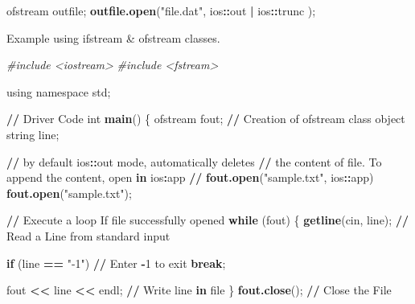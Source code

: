 \documentclass[
]{article}
\newenvironment{Shaded}{\begin{snugshade}}{\end{snugshade}}
\newcommand{\CommentTok}[1]{\textcolor[rgb]{0.56,0.35,0.01}{\textit{#1}}}
\newcommand{\ControlFlowTok}[1]{\textcolor[rgb]{0.13,0.29,0.53}{\textbf{#1}}}
\newcommand{\DecValTok}[1]{\textcolor[rgb]{0.00,0.00,0.81}{#1}}
\newcommand{\ErrorTok}[1]{\textcolor[rgb]{0.64,0.00,0.00}{\textbf{#1}}}
\newcommand{\FunctionTok}[1]{\textcolor[rgb]{0.13,0.29,0.53}{\textbf{#1}}}
\newcommand{\NormalTok}[1]{#1}
\newcommand{\SpecialCharTok}[1]{\textcolor[rgb]{0.81,0.36,0.00}{\textbf{#1}}}
\newcommand{\StringTok}[1]{\textcolor[rgb]{0.31,0.60,0.02}{#1}}
\begin{document}
\begin{Shaded}
\begin{Highlighting}[]
\NormalTok{ofstream outfile;}
\FunctionTok{outfile.open}\NormalTok{(}\StringTok{"file.dat"}\NormalTok{, ios}\SpecialCharTok{::}\NormalTok{out }\SpecialCharTok{|}\NormalTok{ ios}\SpecialCharTok{::}\NormalTok{trunc );}
\end{Highlighting}
\end{Shaded}

Example using ifstream \& ofstream classes.

\begin{Shaded}
\begin{Highlighting}[]
\CommentTok{\#include \textless{}iostream\textgreater{} }
\CommentTok{\#include \textless{}fstream\textgreater{} }
  
\NormalTok{using namespace std; }
  
\SpecialCharTok{/}\ErrorTok{/}\NormalTok{ Driver Code }
\NormalTok{int }\FunctionTok{main}\NormalTok{() }
\NormalTok{\{ }
\NormalTok{    ofstream fout; }\SpecialCharTok{/}\ErrorTok{/}\NormalTok{ Creation of ofstream class object }
\NormalTok{    string line; }
  
    \SpecialCharTok{/}\ErrorTok{/}\NormalTok{ by default ios}\SpecialCharTok{::}\NormalTok{out mode, automatically deletes }
    \SpecialCharTok{/}\ErrorTok{/}\NormalTok{ the content of file. To append the content, open }\ControlFlowTok{in}\NormalTok{ ios}\SpecialCharTok{:}\NormalTok{app }
    \SpecialCharTok{/}\ErrorTok{/} \FunctionTok{fout.open}\NormalTok{(}\StringTok{"sample.txt"}\NormalTok{, ios}\SpecialCharTok{::}\NormalTok{app) }
    \FunctionTok{fout.open}\NormalTok{(}\StringTok{"sample.txt"}\NormalTok{); }
  
    \SpecialCharTok{/}\ErrorTok{/}\NormalTok{ Execute a loop If file successfully opened }
    \ControlFlowTok{while}\NormalTok{ (fout) \{ }
        \FunctionTok{getline}\NormalTok{(cin, line);  }\SpecialCharTok{/}\ErrorTok{/}\NormalTok{ Read a Line from standard input }
  
        \ControlFlowTok{if}\NormalTok{ (line }\SpecialCharTok{==} \StringTok{"{-}1"}\NormalTok{) }\SpecialCharTok{/}\ErrorTok{/}\NormalTok{ Enter }\SpecialCharTok{{-}}\DecValTok{1}\NormalTok{ to exit }
            \ControlFlowTok{break}\NormalTok{; }
      
\NormalTok{        fout }\SpecialCharTok{\textless{}}\ErrorTok{\textless{}}\NormalTok{ line }\SpecialCharTok{\textless{}}\ErrorTok{\textless{}}\NormalTok{ endl; }\SpecialCharTok{/}\ErrorTok{/}\NormalTok{ Write line }\ControlFlowTok{in}\NormalTok{ file }
\NormalTok{    \} }
    \FunctionTok{fout.close}\NormalTok{(); }\SpecialCharTok{/}\ErrorTok{/}\NormalTok{ Close the File }
  

\end{Highlighting}
\end{Shaded}
\end{document}
